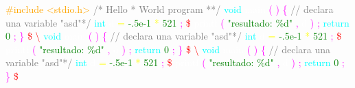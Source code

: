 \justifying \small 

\textcolor{orange}{\#include <stdio.h>} \textcolor{gray}{/* Hello 
 * World program
 **/} \textcolor{cyan}{void} \textcolor{white}{main} 
\textcolor{magenta}{(} \textcolor{magenta}{)} \textcolor{magenta}{\{} \textcolor{gray}{// declara una variable "asd"*/} 
\textcolor{cyan}{int} \textcolor{white}{d} \textcolor{yellow}{=} \textcolor{green}{-.5e-1} 
\textcolor{yellow}{*} \textcolor{green}{521} \textcolor{magenta}{;} \textcolor{red}{\$} 
\textcolor{white}{printf} \textcolor{magenta}{(} \textcolor{green}{"resultado: \%d"} \textcolor{magenta}{,} 
\textcolor{white}{d} \textcolor{magenta}{)} \textcolor{magenta}{;} \textcolor{cyan}{return} 
\textcolor{green}{0} \textcolor{magenta}{;} \textcolor{magenta}{\}} \textcolor{red}{\$} 
\textcolor{red}{\textbackslash} \textcolor{cyan}{void} \textcolor{white}{main} \textcolor{magenta}{(} 
\textcolor{magenta}{)} \textcolor{magenta}{\{} \textcolor{gray}{// declara una variable "asd"*/} \textcolor{cyan}{int} 
\textcolor{white}{d} \textcolor{yellow}{=} \textcolor{green}{-.5e-1} \textcolor{yellow}{*} 
\textcolor{green}{521} \textcolor{magenta}{;} \textcolor{red}{\$} \textcolor{white}{printf} 
\textcolor{magenta}{(} \textcolor{green}{"resultado: \%d"} \textcolor{magenta}{,} \textcolor{white}{d} 
\textcolor{magenta}{)} \textcolor{magenta}{;} \textcolor{cyan}{return} \textcolor{green}{0} 
\textcolor{magenta}{;} \textcolor{magenta}{\}} \textcolor{red}{\$} \textcolor{red}{\textbackslash} 
\textcolor{cyan}{void} \textcolor{white}{main} \textcolor{magenta}{(} \textcolor{magenta}{)} 
\textcolor{magenta}{\{} \textcolor{gray}{// declara una variable "asd"*/} \textcolor{cyan}{int} \textcolor{white}{d} 
\textcolor{yellow}{=} \textcolor{green}{-.5e-1} \textcolor{yellow}{*} \textcolor{green}{521} 
\textcolor{magenta}{;} \textcolor{red}{\$} \textcolor{white}{printf} \textcolor{magenta}{(} 
\textcolor{green}{"resultado: \%d"} \textcolor{magenta}{,} \textcolor{white}{d} \textcolor{magenta}{)} 
\textcolor{magenta}{;} \textcolor{cyan}{return} \textcolor{green}{0} \textcolor{magenta}{;} 
\textcolor{magenta}{\}} \textcolor{red}{\$} 



